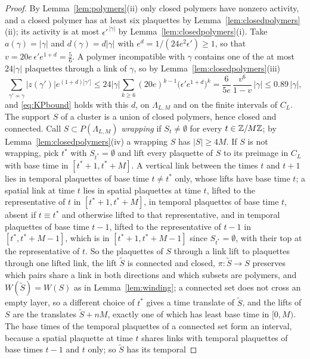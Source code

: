 \begin{proof}
By Lemma~\ref{lem:polymers}(ii) only closed polymers have nonzero activity,
and a closed polymer has at least six plaquettes by
Lemma~\ref{lem:closedpolymers}(ii); its activity is at most $\epsilon'^{\,
|\gamma|}$ by Lemma~\ref{lem:closedpolymers}(i). Take $a(\gamma)=|\gamma|$
and $d(\gamma)=d|\gamma|$ with $e^{d}=1/(24e^2\epsilon')\ge1$, so that $v=
20e\,\epsilon'e^{1+d}=\frac56$. A polymer incompatible with $\gamma$ contains
one of the at most $24|\gamma|$ plaquettes through a link of $\gamma$, so by
Lemma~\ref{lem:closedpolymers}(iii)
\[
\sum_{\gamma'\not\sim\gamma}|z(\gamma')|e^{(1+d)|\gamma'|}\le24|\gamma|
\sum_{k\ge6}(20e)^{k-1}\bigl(\epsilon'e^{1+d}\bigr)^k=\frac{6}{5e}\,
\frac{v^6}{1-v}\,|\gamma|\le0.89\,|\gamma|,
\]
and \eqref{eq:KPbound} holds with this $d$, on $\Lambda_{L,M}$ and on the
finite intervals of $C_L$. The support $S$ of a cluster is a union of closed
polymers, hence closed and connected. Call $S\subset P(\Lambda_{L,M})$
\emph{wrapping} if $S_t\ne\emptyset$ for every $t\in\mathbb{Z}/M\mathbb{Z}$; by
Lemma~\ref{lem:closedpolymers}(iv) a wrapping $S$ has $|S|\ge4M$. If $S$ is
not wrapping, pick $t^*$ with $S_{t^*}=\emptyset$ and lift every plaquette
of $S$ to its preimage in $C_L$ with base time in $[t^*+1,t^*+M]$. A
vertical link between the times $t$ and $t+1$ lies in temporal plaquettes of
base time $t\ne t^*$ only, whose lifts have base time $t$; a spatial link at
time $t$ lies in spatial plaquettes at time $t$, lifted to the
representative of $t$ in $[t^*+1,t^*+M]$, in temporal plaquettes of base
time $t$, absent if $t\equiv t^*$ and otherwise lifted to that
representative, and in temporal plaquettes of base time $t-1$, lifted to
the representative of $t-1$ in $[t^*,t^*+M-1]$, which is in $[t^*+1,t^*+M-
1]$ since $S_{t^*}=\emptyset$, with their top at the representative of $t$.
So the plaquettes of $S$ through a link lift to plaquettes through one
lifted link, the lift $\tilde S$ is connected and closed, $\pi:\tilde S\to
S$ preserves which pairs share a link in both directions and which subsets
are polymers, and $W(\tilde S)=W(S)$ as in Lemma~\ref{lem:winding}; a
connected set does not cross an empty layer, so a different choice of $t^*$
gives a time translate of $\tilde S$, and the lifts of $S$ are the translates
$\tilde S+nM$, exactly one of which has least base time in $[0,M)$. The
base times of the temporal plaquettes of a connected set form an interval,
because a spatial plaquette at time $t$ shares links with temporal
plaquettes of base times $t-1$ and $t$ only; so $\tilde S$ has its temporal

\end{proof}
